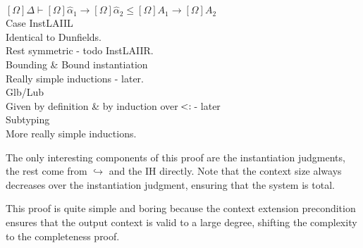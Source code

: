 \documentclass{article}
\newcommand{\st}{\ensuremath{\hspace{-1px}<:\hspace{-1px}}}
\newcommand{\alphahat}{\hat{\alpha}}
\begin{document}
\begin{tabbing}
\>\>$[\Omega]\Delta \vdash [\Omega]\alphahat_1 \rightarrow [\Omega]\alphahat_2 \leq [\Omega]A_1 \rightarrow [\Omega]A_2$\\
\>Case InstLAIIL\\
\>\>Identical to Dunfields.\\
\>Rest symmetric - todo InstLAIIR.\\
Bounding \& Bound instantiation\\
\>Really simple inductions - later.\\
Glb/Lub\\
\>Given by definition \& by induction over $\st$ - later\\
Subtyping\\
\>More really simple inductions.\\
\end{tabbing}
The only interesting components of this proof are the instantiation judgments, the rest come from $\hookrightarrow$ and the IH directly. Note that the context size always decreases over the instantiation judgment, ensuring that the system is total.

This proof is quite simple and boring because the context extension precondition ensures that the output context is valid to a large degree, shifting the complexity to the completeness proof.
\end{document}
